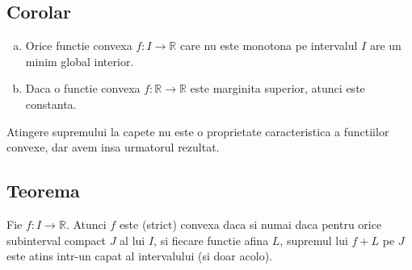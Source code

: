 \documentclass[a4paper,12pt,oneside]{report}
\begin{document}
\subsection{Corolar}
\begin{enumerate}[a)]
\item Orice functie convexa \(f: I \rightarrow \mathbb{R}\) care nu este monotona pe
intervalul \(I\) are un minim global interior. 
\item Daca o functie convexa \(f: \mathbb{R} \rightarrow \mathbb{R}\) este marginita superior, atunci este constanta.
\end{enumerate}
Atingere supremului la capete nu este o proprietate caracteristica a functiilor convexe, dar avem insa urmatorul rezultat. 

\subsection{Teorema}

Fie \(f: I \rightarrow \mathbb{R}\). Atunci \(f\) este (strict) convexa daca si numai daca pentru orice subinterval compact \(J\) al lui \(I\), si fiecare functie afina \(L\), supremul lui \(f+L\) pe \(J\) este atins intr-un capat al intervalului (si doar acolo). 
\end{document}
